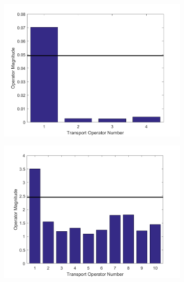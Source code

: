 \documentclass[letterpaper]{article} %
\begin{document}
\begin{figure}[h]

\centering
\begin{subfigure}[b]{0.49\columnwidth}
  \centering
	{\includegraphics[width=0.99\columnwidth]{circleTransOptMag_new.png}}
  \caption{}
	\label{fig:circleTOMag}
\end{subfigure}
\begin{subfigure}[b]{0.49\columnwidth}
  \centering
	{\includegraphics[width=0.99\columnwidth]{rotDigitTransOptMag.png}}
  \caption{}
	\label{fig:rotTOMag}
\end{subfigure}
\begin{subfigure}[b]{0.49\columnwidth}
  \centering

\end{subfigure}
\end{figure}
\end{document}
